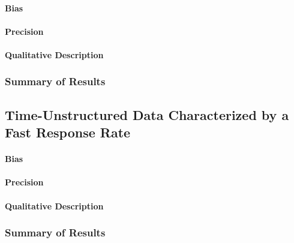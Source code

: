 \documentclass[
12pt, %
twoside,
english]{guelphthesis}
\begin{document}
\hypertarget{bias-time-struc-exp3}{%
\paragraph{Bias}\label{bias-time-struc-exp3}}

\hypertarget{precision-time-struc-exp3}{%
\paragraph{Precision}\label{precision-time-struc-exp3}}

\hypertarget{qualitative-time-struc-exp3}{%
\paragraph{Qualitative Description}\label{qualitative-time-struc-exp3}}

\hypertarget{summary-of-results-8}{%
\subsubsection{Summary of Results}\label{summary-of-results-8}}

\hypertarget{time-unstructured-data-characterized-by-a-fast-response-rate}{%
\subsection{Time-Unstructured Data Characterized by a Fast Response Rate}\label{time-unstructured-data-characterized-by-a-fast-response-rate}}

\hypertarget{bias-fast-exp3}{%
\paragraph{Bias}\label{bias-fast-exp3}}

\hypertarget{precision-fast-exp3}{%
\paragraph{Precision}\label{precision-fast-exp3}}

\hypertarget{qualitative-fast-exp3}{%
\paragraph{Qualitative Description}\label{qualitative-fast-exp3}}

\hypertarget{summary-of-results-9}{%
\subsubsection{Summary of Results}\label{summary-of-results-9}}
\end{document}
